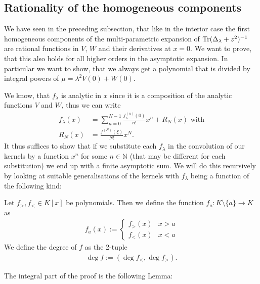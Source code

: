 \subsection{Rationality of the homogeneous components}
We have seen in the preceding subsection, that like in the interior case the
first homogeneous components of the multi-parametric expansion of
$\operatorname{Tr}(\Delta_\lambda + z^2)^{-1}$ are rational functions in $V$, $W$ and their
derivatives at $x = 0$. We want to prove, that this also holds for all higher
orders in the asymptotic expansion. In particular we want to show, that we
always get a polynomial that is divided by integral powers of $\mu = \lambda^2
V(0) + W(0)$. %

We know, that $f_\lambda$ is analytic in $x$ since it is a composition of
the analytic functions $V$ and $W$, thus we can write
\begin{align*}
  f_\lambda(x) &= \sum_{n=0}^{N-1} \frac{f_\lambda^{(n)}(0)}{n!} x^n + R_N(x)
  \text{ with} \\ R_N(x) &= \frac{f^{(N)}(\xi)}{N!} x^{N}.
\end{align*}
It thus suffices to show that if we substitute each $f_\lambda$ in the
convolution of our kernels by a function $x^{n}$ for some $n\in\mathbb{N}$ (that
may be different for each substitution) we end up with a finite asymptotic sum.
We will do this recursively by looking at suitable generalisations of the
kernels with $f_\lambda$ being a function of the following kind:
\begin{Definition}
  Let $f_>, f_<\in K[x]$ be polynomials. Then we define the function $f_a\colon
  K\setminus\{a\}\to K$ as 
  \begin{align*}
    f_a(x) := \begin{cases}
      f_>(x) & x > a \\
      f_<(x) & x < a
    \end{cases}
  \end{align*}
  We define the degree of $f$ as the 2-tuple
  \begin{align*}
    \deg f := \left(\deg f_<, \deg f_>\right).
  \end{align*}
\end{Definition}
The integral part of the proof is the following Lemma:
